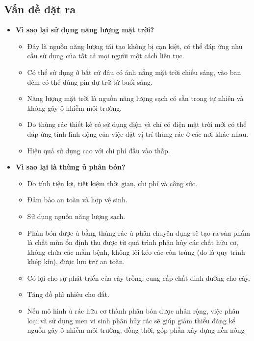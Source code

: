 \documentclass[12pt, a4paper]{article}
\begin{document}
\subsection{Vấn đề đặt ra}

\begin{itemize}
    \item \textbf{Vì sao lại sử dụng năng lượng mặt trời?}
    \begin{itemize}
        \item Đây là nguồn năng lượng tái tạo không bị cạn kiệt, có thể đáp ứng nhu cầu sử dụng của tất cả mọi người một cách liên tục. 
        \item Có thể sử dụng ở bất cứ đâu có ánh nắng mặt trời chiếu sáng, vào ban đêm có thể dùng pin dự trữ từ buổi sáng. 
        \item Năng lượng mặt trời là nguồn năng lượng sạch có sẵn trong tự nhiên và không gây ô nhiễm môi trường. 
        \item Do thùng rác thiết kế có sử dụng điện và chỉ có điện mặt trời mới có thể đáp ứng tính linh động của việc đặt vị trí thùng rác ở các nơi khác nhau.
        \item Hiệu quả sử dụng cao với chi phí đầu vào thấp. 
    \end{itemize}
    \item \textbf{Vì sao lại là thùng ủ phân bón?}
    \begin{itemize}
        \item Do tính tiện lợi, tiết kiệm thời gian, chi phí và công sức.
        \item Đảm bảo an toàn và hợp vệ sinh.
        \item Sử dụng nguồn năng lượng sạch.
        \item Phân bón được ủ bằng thùng rác ủ phân chuyên dụng sẽ tạo ra sản phẩm là chất mùn ổn định thu được từ quá trình phân hủy các chất hữu cơ, không chứa các mầm bệnh, không lôi kéo các côn trùng (do là quy trình khép kín), được lưu trữ an toàn.
        \item Có lợi cho sự phát triển của cây trồng: cung cấp chất dinh dưỡng cho cây.
        \item Tăng đồ phì nhiêu cho đất.
        \item Nếu mô hình ủ rác hữu cơ thành phân bón được nhân rộng, việc phân loại và sử dụng men vi sinh phân hủy rác sẽ giúp giảm thiểu đáng kể nguồn gây ô nhiễm môi trường; đồng thời, góp phần xây dựng nền nông nghiệp tiết kiệm, an toàn và bền vững.
    \end{itemize}
    \item \textbf{Áp dụng vào môn học như thế nào?} 
    \begin{itemize}
        \item Vận dụng kiến thức lập trình IoT, mạch điện Arduino và các thiết bị điện tử liên quan. 
        \item Tạo ra một dự án thiết thực, tính ứng dụng và giúp ích cho cộng đồng cao. 
    \end{itemize}
\end{itemize}
\end{document}
